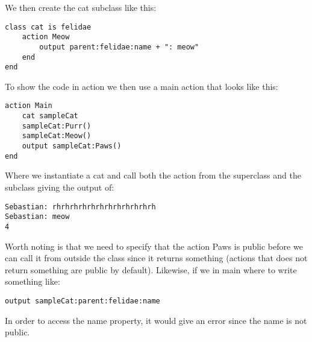 We then create the cat subclass like this:

\begin{lstlisting}[language=Quorum]
class cat is felidae
    action Meow
        output parent:felidae:name + ": meow"
    end
end
\end{lstlisting}

To show the code in action we then use a main action that looks like this:

\begin{lstlisting}[language=Quorum]
action Main
    cat sampleCat
    sampleCat:Purr()
    sampleCat:Meow()
    output sampleCat:Paws()
end
\end{lstlisting}

Where we instantiate a cat and call both the action from the superclass and the subclass giving the output of: 

\lstinline!Sebastian: rhrhrhrhrhrhrhrhrhrhrhrh!\\
\lstinline!Sebastian: meow!\\
\lstinline!4!

Worth noting is that we need to specify that the action Paws is public before we can call it from outside the class since it returns something (actions that does not return something are public by default). Likewise, if we in main where to write something like:

\begin{lstlisting}[language=Quorum]
output sampleCat:parent:felidae:name
\end{lstlisting}

In order to access the name property, it would give an error since the name is not public.